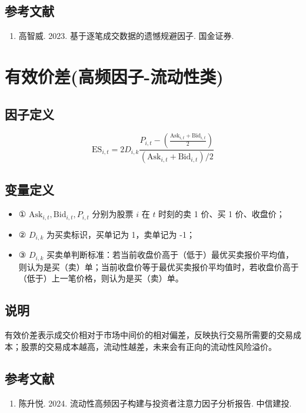 \documentclass{article}
\begin{document}
\subsection{参考文献}
\begin{enumerate}
    \item 高智威. 2023. 基于逐笔成交数据的遗憾规避因子. 国金证券.
\end{enumerate}

\section{有效价差(高频因子-流动性类)}

\subsection{因子定义}
\begin{equation}
    \mathrm{ES}_{i,t} = 2 D_{i,k} \frac{P_{i,t} - \left( \frac{\mathrm{Ask}_{i,t} + \mathrm{Bid}_{i,t}}{2} \right)}{\left( \mathrm{Ask}_{i,t} + \mathrm{Bid}_{i,t} \right)/2}
\end{equation}

\subsection{变量定义}
\begin{itemize}
    \item ① \( \mathrm{Ask}_{i,t}, \mathrm{Bid}_{i,t}, P_{i,t} \) 分别为股票 \( i \) 在 \( t \) 时刻的卖 1 价、买 1 价、收盘价；
    \item ② \( D_{i,k} \) 为买卖标识，买单记为 1，卖单记为 -1；
    \item ③ \( D_{i,k} \) 买卖单判断标准：若当前收盘价高于（低于）最优买卖报价平均值，则认为是买（卖）单；当前收盘价等于最优买卖报价平均值时，若收盘价高于（低于）上一笔价格，则认为是买（卖）单。
\end{itemize}

\subsection{说明}
有效价差表示成交价相对于市场中间价的相对偏差，反映执行交易所需要的交易成本；股票的交易成本越高，流动性越差，未来会有正向的流动性风险溢价。

\subsection{参考文献}
\begin{enumerate}
    \item 陈升悦. 2024. 流动性高频因子构建与投资者注意力因子分析报告. 中信建投.
\end{enumerate}
\end{document}
